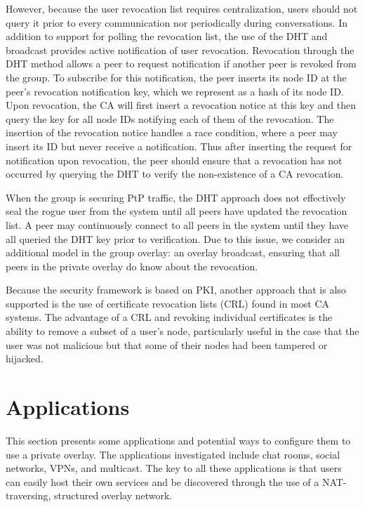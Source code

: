 However, because the user revocation list requires centralization, users should
not query it prior to every communication nor periodically during conversations.
In addition to support for polling the revocation list, the use of the DHT and
broadcast provides active notification of user revocation.  Revocation through
the DHT method allows a peer to request notification if another peer is revoked
from the group.  To subscribe for this notification, the peer inserts its node
ID at the peer's revocation notification key, which we represent as a hash of
its node ID.  Upon revocation, the CA will first insert a revocation notice at
this key and then query the key for all node IDs notifying each of them of the
revocation.  The insertion of the revocation notice handles a race condition,
where a peer may insert its ID but never receive a notification.  Thus after
inserting the request for notification upon revocation, the peer should ensure
that a revocation has not occurred by querying the DHT to verify the
non-existence of a CA revocation.

When the group is securing PtP traffic, the DHT approach does not effectively
seal the rogue user from the system until all peers have updated the revocation
list.  A peer may continuously connect to all peers in the system until they
have all queried the DHT key prior to verification.  Due to this issue, we 
consider an additional model in the group overlay: an overlay broadcast, ensuring
that all peers in the private overlay do know about the revocation.  

Because the security framework is based on PKI, another approach that is also
supported is the use of certificate revocation lists (CRL) found in most CA
systems.  The advantage of a CRL and revoking individual certificates is the
ability to remove a subset of a user's node, particularly useful in the case
that the user was not malicious but that some of their nodes had been tampered
or hijacked.

\section{Applications}
\label{applications}
This section presents some applications and potential ways to configure them
to use a private overlay.  The applications investigated include chat rooms,
social networks, VPNs, and multicast.  The key to all these applications is that
users can easily host their own services and be discovered through the use of
a NAT-traversing, structured overlay network.

